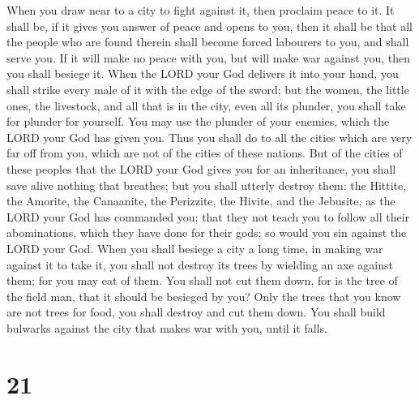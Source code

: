  When you draw near to a city to fight against it, then
proclaim peace to it.  It shall be, if it gives you answer
of peace and opens to you, then it shall be that all the people who are
found therein shall become forced labourers to you, and shall serve you.
 If it will make no peace with you, but will make war
against you, then you shall besiege it.  When the LORD your
God delivers it into your hand, you shall strike every male of it with
the edge of the sword;  but the women, the little ones, the
livestock, and all that is in the city, even all its plunder, you shall
take for plunder for yourself. You may use the plunder of your enemies,
which the LORD your God has given you.  Thus you shall do
to all the cities which are very far off from you, which are not of the
cities of these nations.  But of the cities of these
peoples that the LORD your God gives you for an inheritance, you shall
save alive nothing that breathes;  but you shall utterly
destroy them: the Hittite, the Amorite, the Canaanite, the Perizzite,
the Hivite, and the Jebusite, as the LORD your God has commanded you;
 that they not teach you to follow all their abominations,
which they have done for their gods; so would you sin against the LORD
your God.  When you shall besiege a city a long time, in
making war against it to take it, you shall not destroy its trees by
wielding an axe against them; for you may eat of them. You shall not cut
them down, for is the tree of the field man, that it should be besieged
by you?  Only the trees that you know are not trees for
food, you shall destroy and cut them down. You shall build bulwarks
against the city that makes war with you, until it falls.

\hypertarget{section-20}{%
\section{21}\label{section-20}}


